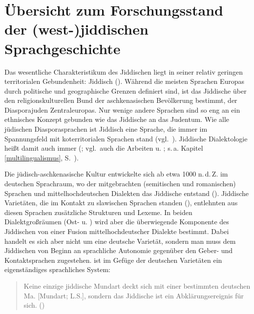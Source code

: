 \section{Übersicht zum Forschungsstand der (west-)jiddischen Sprachgeschichte}\label{westjiddistik}
 
Das wesentliche Charakteristikum des Jiddischen liegt in seiner relativ geringen territorialen Gebundenheit: Jiddisch  (\citealt[7]{Weinreich1962}). Während die meisten Sprachen Europas durch politische und geographische Grenzen definiert sind, ist das Jiddische über den religionskulturellen Bund der aschkenasischen Bevölkerung bestimmt, der Diasporajuden Zentraleuropas. Nur wenige andere Sprachen sind so eng an ein ethnisches Konzept gebunden wie das Jiddische an das Judentum.  Wie alle jüdischen Diasporasprachen ist Jiddisch eine Sprache, die immer im Spannungsfeld mit koterritorialen Sprachen stand (vgl.\, \citealt{Spolsky2014}). Jiddische Dialektologie heißt damit auch immer  (\citealt{Weinreich1962}; vgl.\, auch die Arbeiten \citealt{Mieses1915} u. \citealt{Fischer1936}; s.\,a. Kapitel \ref{multilingualismus}, S.\, \pageref{multilingualismus}).

Die jüdisch-aschkenasische Kultur entwickelte sich ab etwa 1000 n.\,d.\,Z. im deutschen Sprachraum, wo  der mitgebrachten (semitischen und romanischen) Sprachen und mittelhochdeutschen Dialekten das Jiddische entstand (\citealt[1018]{Katz1983}). Jiddische Varietäten, die im Kontakt zu slawischen Sprachen standen (), entlehnten aus diesen Sprachen zusätzliche Strukturen und Lexeme. In beiden Dialektgroßräumen (Ost- u. ) wird aber die überwiegende Komponente des Jiddischen von einer Fusion mittelhochdeutscher Dialekte bestimmt. Dabei handelt es sich aber nicht um eine deutsche Varietät, sondern man muss dem Jiddischen von Beginn an sprachliche Autonomie gegenüber den Geber- und Kontaktsprachen zugestehen.  ist im Gefüge der deutschen Varietäten ein eigenständiges sprachliches System: 

\begin{quote}Keine einzige jiddische Mundart deckt sich mit einer bestimmten deutschen Ma. [Mundart; L.S.], sondern das Jiddische ist ein Abklärungsereignis für sich. (\citealt[69; s.\,a. 53–56]{Weinreich1923}) 
\end{quote}

